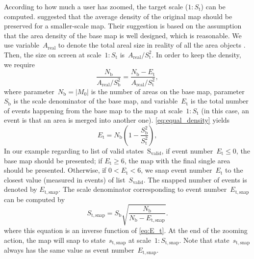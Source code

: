 \documentclass{ica}
\begin{document}
According to how much a user has zoomed,
the target scale (\ie $1:S_\mathrm{t}$) can be computed.
\citet{Huang2016Webmap} suggested that 
the average density of the original map should be preserved 
for a smaller-scale map.
Their suggestion is based on the assumption that 
the area density of the base map is well designed, which is reasonable.
We use variable~$A_\mathrm{real}$ to denote the total areal size in reality
of all the area objects .
Then, the size on screen at scale~$1:S_\mathrm{t}$ 
is~$A_\mathrm{real} \big/ S^2_\mathrm{t}$.
In order to keep the density, we require
\begin{equation}
\label{eq:equal_density}
\frac{N_\mathrm{b}}{A_\mathrm{real} \big/ S^2_\mathrm{b}} =
\frac{N_\mathrm{b}-E_\mathrm{t}}{A_\mathrm{real} \big/ S^2_\mathrm{t}},
\end{equation}
where parameter~$N_\mathrm{b} = |M_0|$ 
is the number of areas on the base map,
parameter~$S_\mathrm{b}$ is the scale denominator of the base map,
and variable~$E_\mathrm{t}$ is the total number of events 
happening from the base map to the map at scale~$1:S_\mathrm{t}$
(in this case, an event is that an area is merged into another one).
\eq\ref{eq:equal_density} yields
\begin{equation}
\label{eq:E_t}
E_\mathrm{t} = N_\mathrm{b} \left(1-\frac{S^2_\mathrm{b}}{S^2_\mathrm{t}}\right),
\end{equation}
In our example regarding to list of valid states~$\mathrm{S_\mathrm{valid}}$,
if event number~$E_\mathrm{t} \le 0$, the base map should be presented;
if $E_\mathrm{t} \ge 6$, 
the map with the final single area should be presented.
Otherwise, if $0<E_\mathrm{t} < 6$, we snap event number~$E_\mathrm{t}$ 
to the closest value (measured in events) of list~$S_\mathrm{valid}$.
The snapped number of events 
is denoted by $E_\mathrm{t,snap}$.
The scale denominator corresponding to event number~$E_\mathrm{t,snap}$
can be computed by 
\begin{equation}
\label{eq:S_t_snap}
S_\mathrm{t,snap} = S_\mathrm{b} \sqrt{\frac{N_\mathrm{b}}{N_\mathrm{b}-E_\mathrm{t,snap}}}.
\end{equation}
where this equation is an inverse function of \eq\ref{eq:E_t}.
At the end of the zooming action, 
the map will snap to state~$s_\mathrm{t,snap}$
at scale~$1:S_\mathrm{t,snap}$.
Note that state~$s_\mathrm{t,snap}$ always has 
the same value as event number~$E_\mathrm{t,snap}$.
\end{document}
